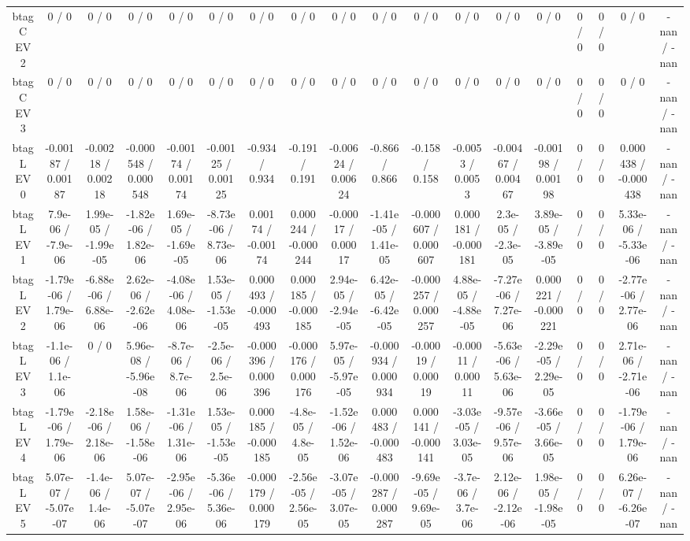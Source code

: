 \documentclass[10pt]{article}
\begin{document}
\begin{table}[htbp]
\begin{center}
\begin{tabular}{|c|c|c|c|c|c|c|c|c|c|c|c|c|c|c|c|c|c|}
  btag C EV 2 & 0 / 0 & 0 / 0 & 0 / 0 & 0 / 0 & 0 / 0 & 0 / 0 & 0 / 0 & 0 / 0 & 0 / 0 & 0 / 0 & 0 / 0 & 0 / 0 & 0 / 0 & 0 / 0 & 0 / 0 & 0 / 0 & -nan / -nan \\ 
  btag C EV 3 & 0 / 0 & 0 / 0 & 0 / 0 & 0 / 0 & 0 / 0 & 0 / 0 & 0 / 0 & 0 / 0 & 0 / 0 & 0 / 0 & 0 / 0 & 0 / 0 & 0 / 0 & 0 / 0 & 0 / 0 & 0 / 0 & -nan / -nan \\ 
  btag L EV 0 & -0.00187 / 0.00187 & -0.00218 / 0.00218 & -0.000548 / 0.000548 & -0.00174 / 0.00174 & -0.00125 / 0.00125 & -0.934 / 0.934 & -0.191 / 0.191 & -0.00624 / 0.00624 & -0.866 / 0.866 & -0.158 / 0.158 & -0.0053 / 0.0053 & -0.00467 / 0.00467 & -0.00198 / 0.00198 & 0 / 0 & 0 / 0 & 0.000438 / -0.000438 & -nan / -nan \\ 
  btag L EV 1 & 7.9e-06 / -7.9e-06 & 1.99e-05 / -1.99e-05 & -1.82e-06 / 1.82e-06 & 1.69e-05 / -1.69e-05 & -8.73e-06 / 8.73e-06 & 0.00174 / -0.00174 & 0.000244 / -0.000244 & -0.00017 / 0.00017 & -1.41e-05 / 1.41e-05 & -0.000607 / 0.000607 & 0.000181 / -0.000181 & 2.3e-05 / -2.3e-05 & 3.89e-05 / -3.89e-05 & 0 / 0 & 0 / 0 & 5.33e-06 / -5.33e-06 & -nan / -nan \\ 
  btag L EV 2 & -1.79e-06 / 1.79e-06 & -6.88e-06 / 6.88e-06 & 2.62e-06 / -2.62e-06 & -4.08e-06 / 4.08e-06 & 1.53e-05 / -1.53e-05 & 0.000493 / -0.000493 & 0.000185 / -0.000185 & 2.94e-05 / -2.94e-05 & 6.42e-05 / -6.42e-05 & -0.000257 / 0.000257 & 4.88e-05 / -4.88e-05 & -7.27e-06 / 7.27e-06 & 0.000221 / -0.000221 & 0 / 0 & 0 / 0 & -2.77e-06 / 2.77e-06 & -nan / -nan \\ 
  btag L EV 3 & -1.1e-06 / 1.1e-06 & 0 / 0 & 5.96e-08 / -5.96e-08 & -8.7e-06 / 8.7e-06 & -2.5e-06 / 2.5e-06 & -0.000396 / 0.000396 & -0.000176 / 0.000176 & 5.97e-05 / -5.97e-05 & -0.000934 / 0.000934 & -0.00019 / 0.00019 & -0.00011 / 0.00011 & -5.63e-06 / 5.63e-06 & -2.29e-05 / 2.29e-05 & 0 / 0 & 0 / 0 & 2.71e-06 / -2.71e-06 & -nan / -nan \\ 
  btag L EV 4 & -1.79e-06 / 1.79e-06 & -2.18e-06 / 2.18e-06 & 1.58e-06 / -1.58e-06 & -1.31e-06 / 1.31e-06 & 1.53e-05 / -1.53e-05 & 0.000185 / -0.000185 & -4.8e-05 / 4.8e-05 & -1.52e-06 / 1.52e-06 & 0.000483 / -0.000483 & 0.000141 / -0.000141 & -3.03e-05 / 3.03e-05 & -9.57e-06 / 9.57e-06 & -3.66e-05 / 3.66e-05 & 0 / 0 & 0 / 0 & -1.79e-06 / 1.79e-06 & -nan / -nan \\ 
  btag L EV 5 & 5.07e-07 / -5.07e-07 & -1.4e-06 / 1.4e-06 & 5.07e-07 / -5.07e-07 & -2.95e-06 / 2.95e-06 & -5.36e-06 / 5.36e-06 & -0.000179 / 0.000179 & -2.56e-05 / 2.56e-05 & -3.07e-05 / 3.07e-05 & -0.000287 / 0.000287 & -9.69e-05 / 9.69e-05 & -3.7e-06 / 3.7e-06 & 2.12e-06 / -2.12e-06 & 1.98e-05 / -1.98e-05 & 0 / 0 & 0 / 0 & 6.26e-07 / -6.26e-07 & -nan / -nan \\ 

\end{tabular}
\end{center}
\end{table}
\end{document}
